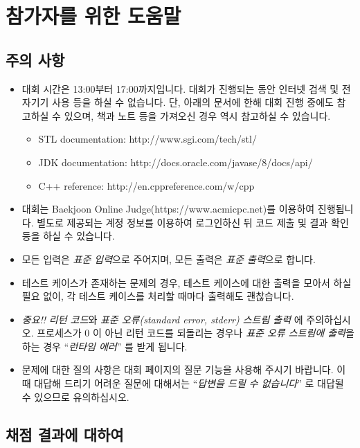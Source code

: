 \section*{참가자를 위한 도움말}

\subsection*{주의 사항}

\begin{itemize}
\item 대회 시간은 13:00부터 17:00까지입니다. 대회가 진행되는 동안 인터넷 검색 및 전자기기 사용 등을 하실 수 없습니다. 단, 아래의 문서에 한해 대회 진행 중에도 참고하실 수 있으며, 책과 노트 등을 가져오신 경우 역시 참고하실 수 있습니다.
\begin{itemize}
  \item STL documentation: http://www.sgi.com/tech/stl/
  \item JDK documentation: http://docs.oracle.com/javase/8/docs/api/
  \item C++ reference: http://en.cppreference.com/w/cpp
\end{itemize}
\item 대회는 Baekjoon Online Judge(https://www.acmicpc.net)를 이용하여 진행됩니다. 별도로 제공되는 계정 정보를 이용하여 로그인하신 뒤 코드 제출 및 결과 확인 등을 하실 수 있습니다.
\item 모든 입력은 \emph{표준 입력}으로 주어지며, 모든 출력은 \emph{표준 출력}으로 합니다.
\item 테스트 케이스가 존재하는 문제의 경우, 테스트 케이스에 대한 출력을 모아서 하실 필요 없이, 각 테스트 케이스를 처리할 때마다 출력해도 괜찮습니다.
\item \emph{중요!!} \emph{리턴 코드}와 \emph{표준 오류(standard error, stderr) 스트림 출력} 에 주의하십시오. 프로세스가 $0$ 이 아닌 리턴 코드를 되돌리는 경우나 \emph{표준 오류 스트림에 출력}을 하는 경우 ``\emph{런타임 에러}'' 를 받게 됩니다.
\item 문제에 대한 질의 사항은 대회 페이지의 질문 기능을 사용해 주시기 바랍니다. 이 때 대답해 드리기 어려운 질문에 대해서는 ``\emph{답변을 드릴 수 없습니다}'' 로 대답될 수 있으므로 유의하십시오.
\end{itemize}

\subsection*{채점 결과에 대하여}

